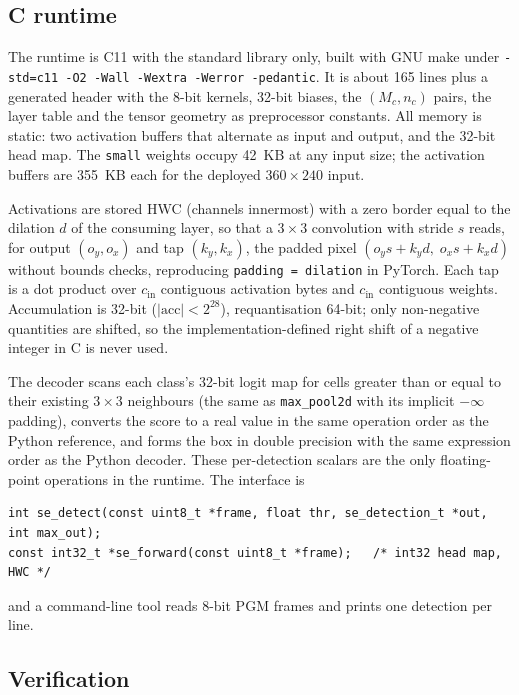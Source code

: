 \documentclass[11pt,a4paper]{article}
\newcommand{\cfg}[1]{\texttt{#1}}
\begin{document}
\subsection{C runtime}

The runtime is C11 with the standard library only, built with GNU make under
\texttt{-std=c11 -O2 -Wall -Wextra -Werror -pedantic}. It is about 165 lines
plus a generated header with the 8-bit kernels, 32-bit biases, the
$(M_c, n_c)$ pairs, the layer table and the tensor geometry as preprocessor
constants. All memory is static: two activation buffers that alternate as
input and output, and the 32-bit head map. The \cfg{small} weights occupy
42~KB at any input size; the activation buffers are 355~KB each for the
deployed $360 \times 240$ input.

Activations are stored HWC (channels innermost) with a zero border equal to
the dilation $d$ of the consuming layer, so that a $3 \times 3$ convolution
with stride $s$ reads, for output $(o_y, o_x)$ and tap $(k_y, k_x)$, the
padded pixel $(o_y s + k_y d,\; o_x s + k_x d)$ without bounds checks,
reproducing \texttt{padding = dilation} in PyTorch. Each tap is a dot product
over $c_\text{in}$ contiguous activation bytes and $c_\text{in}$ contiguous
weights. Accumulation is 32-bit ($|\mathrm{acc}| < 2^{28}$), requantisation
64-bit; only non-negative quantities are shifted, so the
implementation-defined right shift of a negative integer in C is never used.

The decoder scans each class's 32-bit logit map for cells greater than or
equal to their existing $3 \times 3$ neighbours (the same as
\texttt{max\_pool2d} with its implicit $-\infty$ padding), converts the score
to a real value in the same operation order as the Python reference, and
forms the box in double precision with the same expression order as the
Python decoder. These per-detection scalars are the only floating-point
operations in the runtime. The interface is
\begin{verbatim}
int se_detect(const uint8_t *frame, float thr, se_detection_t *out, int max_out);
const int32_t *se_forward(const uint8_t *frame);   /* int32 head map, HWC */
\end{verbatim}
and a command-line tool reads 8-bit PGM frames and prints one detection per
line.

\subsection{Verification}
\end{document}
